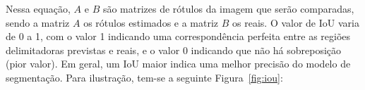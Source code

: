 Nessa equação, $A$ e $B$ são matrizes de rótulos da imagem que serão
comparadas, sendo a matriz $A$ os rótulos estimados e a matriz $B$ os
reais. O valor de IoU varia de 0 a 1, com o valor 1 indicando uma
correspondência perfeita entre as regiões delimitadoras previstas e
reais, e o valor 0 indicando que não há sobreposição (pior valor). Em
geral, um IoU maior indica uma melhor precisão do modelo de
segmentação. Para ilustração, tem-se a seguinte Figura~\ref{fig:iou}:

\begin{figure}[h!]
        \captionsetup{width=12cm}
		\centering
\end{figure}
\FloatBarrier{}
